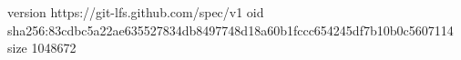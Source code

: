 version https://git-lfs.github.com/spec/v1
oid sha256:83cdbc5a22ae635527834db8497748d18a60b1fccc654245df7b10b0c5607114
size 1048672
